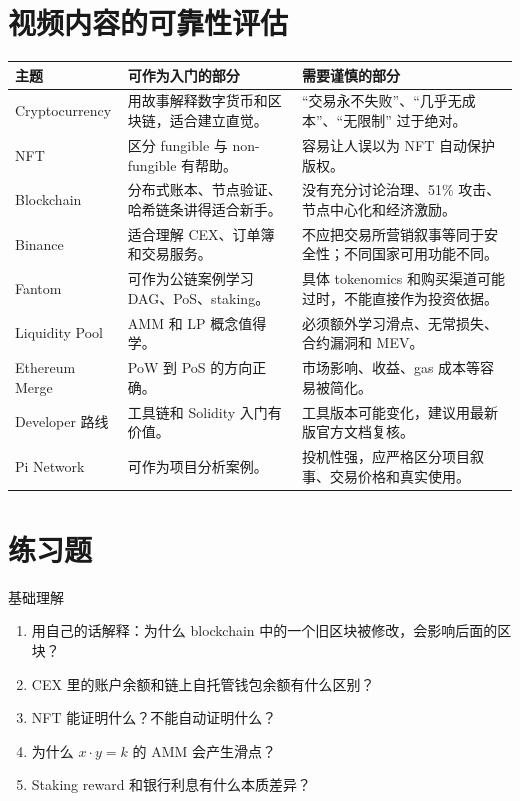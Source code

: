 \documentclass[UTF8,11pt]{ctexart}
\begin{document}
\section{视频内容的可靠性评估}
\label{sec:pitfalls}

\begin{longtable}{>{\raggedright\arraybackslash}p{4cm}>{\raggedright\arraybackslash}p{5.1cm}>{\raggedright\arraybackslash}p{5.3cm}}
\toprule
\textbf{主题} & \textbf{可作为入门的部分} & \textbf{需要谨慎的部分} \\
\midrule
\endhead
Cryptocurrency & 用故事解释数字货币和区块链，适合建立直觉。 & ``交易永不失败''、``几乎无成本''、``无限制'' 过于绝对。 \\
NFT & 区分 fungible 与 non-fungible 有帮助。 & 容易让人误以为 NFT 自动保护版权。 \\
Blockchain & 分布式账本、节点验证、哈希链条讲得适合新手。 & 没有充分讨论治理、51\% 攻击、节点中心化和经济激励。 \\
Binance & 适合理解 CEX、订单簿和交易服务。 & 不应把交易所营销叙事等同于安全性；不同国家可用功能不同。 \\
Fantom & 可作为公链案例学习 DAG、PoS、staking。 & 具体 tokenomics 和购买渠道可能过时，不能直接作为投资依据。 \\
Liquidity Pool & AMM 和 LP 概念值得学。 & 必须额外学习滑点、无常损失、合约漏洞和 MEV。 \\
Ethereum Merge & PoW 到 PoS 的方向正确。 & 市场影响、收益、gas 成本等容易被简化。 \\
Developer 路线 & 工具链和 Solidity 入门有价值。 & 工具版本可能变化，建议用最新版官方文档复核。 \\
Pi Network & 可作为项目分析案例。 & 投机性强，应严格区分项目叙事、交易价格和真实使用。 \\
\bottomrule
\end{longtable}

\section{练习题}

\begin{practicebox}{基础理解}
\begin{enumerate}
  \item 用自己的话解释：为什么 blockchain 中的一个旧区块被修改，会影响后面的区块？
  \item CEX 里的账户余额和链上自托管钱包余额有什么区别？
  \item NFT 能证明什么？不能自动证明什么？
  \item 为什么 \(x\cdot y=k\) 的 AMM 会产生滑点？
  \item Staking reward 和银行利息有什么本质差异？
\end{enumerate}
\end{practicebox}
\end{document}
